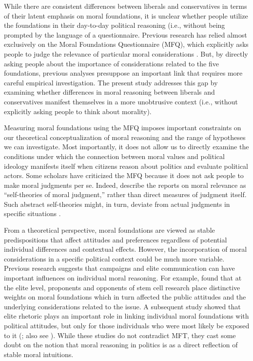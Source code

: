 \documentclass[12pt]{article}
\begin{document}
While there are consistent differences between liberals and conservatives in terms of their latent emphasis on moral foundations, it is unclear whether people utilize the foundations in their day-to-day political reasoning (i.e., without being prompted by the language of a questionnaire. Previous research has relied almost exclusively on the Moral Foundations Questionnaire (MFQ), which explicitly asks people to judge the relevance of particular moral considerations \citep[e.g.][]{graham2011mapping}. But, by directly asking people about the importance of considerations related to the five foundations, previous analyses presuppose an important link that requires more careful empirical investigation. The present study addresses this gap by examining whether differences in moral reasoning between liberals and conservatives manifest themselves in a more unobtrusive context (i.e., without explicitly asking people to think about morality). 

Measuring moral foundations using the MFQ imposes important constraints on our theoretical conceptualization of moral reasoning and the range of hypotheses we can investigate. Most importantly, it does not allow us to directly examine the conditions under which the connection between moral values and political ideology manifests itself when citizens reason about politics and evaluate political actors. Some scholars have criticized the MFQ because it does not ask people to make moral judgments per se. Indeed, \citet[1031]{graham2009liberals} describe the reports on moral relevance as ``self-theories of moral judgment,'' rather than direct measures of judgment itself. Such abstract self-theories might, in turn, deviate from actual judgments in specific situations \citep[see][for an alternative way to measure moral judgment]{clifford2015moral}.

From a theoretical perspective, moral foundations are viewed as stable predispositions that affect attitudes and preferences regardless of potential individual differences and contextual effects. However, the incorporation of moral considerations in a specific political context could be much more variable. Previous research suggests that campaigns and elite communication can have important influences on individual moral reasoning. For example, \citet{clifford2013words} found that at the elite level, proponents and opponents of stem cell research place distinctive weights on moral foundations which in turn affected the public attitudes and the underlying considerations related to the issue. A subsequent study showed that elite rhetoric plays an important role in linking individual moral foundations with political attitudes, but only for those individuals who were most likely be exposed to it (\citealt{clifford2015concerns}; also see \citealt{day2014shifting}). While these studies do not contradict MFT, they cast some doubt on the notion that moral reasoning in politics is as a direct reflection of stable moral intuitions. 
\end{document}

